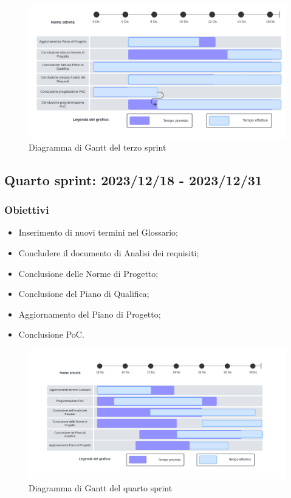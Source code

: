 \begin{figure}[h!]
    \centering  
    \includegraphics[width=\textwidth]{Roadmap3sprint.png}
    \caption{Diagramma di Gantt del terzo sprint}
    \label{fig:roadmap3s}
\end{figure}
\newpage

\subsection{Quarto sprint: 2023/12/18 - 2023/12/31}
\subsubsection{Obiettivi}
\begin{itemize}
    \item Inserimento di nuovi termini nel Glossario;
    \item Concludere il documento di Analisi dei requisiti;
    \item Conclusione delle Norme di Progetto;
    \item Conclusione del Piano di Qualifica;
    \item Aggiornamento del Piano di Progetto;
    \item Conclusione PoC.
\end{itemize}

\begin{figure}[h!]
    \centering  
    \includegraphics[width=\textwidth]{Roadmap4sprint.png}
    \caption{Diagramma di Gantt del quarto sprint}
    \label{fig:roadmap4s}
\end{figure}
\newpage

